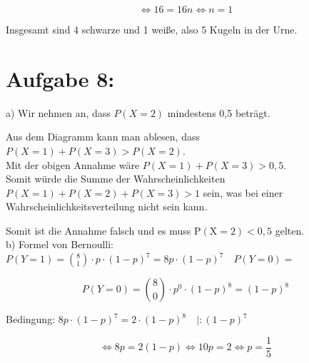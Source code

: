 \documentclass[10pt]{article}
\begin{document}
$$
\Leftrightarrow 16=16 n \Leftrightarrow n=1
$$

Insgesamt sind 4 schwarze und 1 weiße, also 5 Kugeln in der Urne.

\section*{Aufgabe 8:}
a) Wir nehmen an, dass $P(X=2)$ mindestens 0,5 beträgt.

Aus dem Diagramm kann man ablesen, dass $P(X=1)+P(X=3)>P(X=2)$.\\
Mit der obigen Annahme wäre $P(X=1)+P(X=3)>0,5$.\\
Somit würde die Summe der Wahrscheinlichkeiten $P(X=1)+P(X=2)+P(X=3)>1$ sein, was bei einer Wahrscheinlichkeitsverteilung nicht sein kann.

Somit ist die Annahme falsch und es muss $\mathrm{P}(\mathrm{X}=2)<0,5$ gelten.\\
b) Formel von Bernoulli: $P(Y=1)=\binom{8}{1} \cdot p \cdot(1-p)^{7}=8 p \cdot(1-p)^{7} \quad P(Y=0)=$

$$
P(Y=0)=\binom{8}{0} \cdot p^{0} \cdot(1-p)^{8}=(1-p)^{8}
$$

Bedingung: $8 p \cdot(1-p)^{7}=2 \cdot(1-p)^{8} \quad \mid:(1-p)^{7}$

$$
\Leftrightarrow 8 p=2(1-p) \Leftrightarrow 10 p=2 \Leftrightarrow p=\frac{1}{5}
$$
\end{document}

